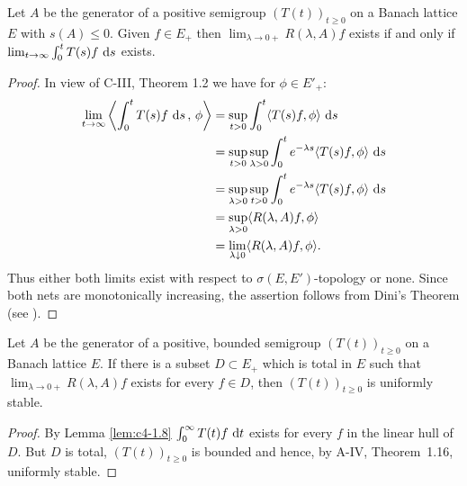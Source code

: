 \begin{lemma}\label{lem:c4-1.8}
%
%
%
Let $A$ be the generator of a positive semigroup $(T(t))_{t\geq 0}$ on a Banach lattice $E$ with $s(A) \leq 0$.
Given $f \in E_{+}$ then $\lim_{\lambda \to 0+} R(\lambda,A)f$ exists if and only if $\lim_{t \to \infty} \int_{0}^{t} T(s)f \, \mathop{}\!\mathrm{d}{s}$ exists.
\end{lemma}
\begin{proof}
In view of C-III, Theorem 1.2 we have for $\phi \in E'_{+}$:
\begin{align*}
\lim_{t \to \infty}  \left\langle\int_{0}^{t} T(s)f \, \mathop{}\!\mathrm{d}{s} \,,\,\phi\right\rangle &= \sup_{t>0} \int_{0}^{t}\langle T(s)f,\phi\rangle \, \mathop{}\!\mathrm{d}{s} \\
&= \sup_{t>0}\sup_{\lambda>0} \int_{0}^{t}e^{-\lambda s}\langle T(s)f,\phi\rangle \, \mathop{}\!\mathrm{d}{s} \\
&= \sup_{\lambda>0}\sup_{t>0} \int_{0}^{t}e^{-\lambda s}\langle T(s)f,\phi\rangle \, \mathop{}\!\mathrm{d}{s} \\
&= \sup_{\lambda>0} \langle R(\lambda,A)f,\phi\rangle \\
&= \lim_{\lambda \downarrow 0} \langle R(\lambda,A)f,\phi\rangle.
\end{align*}
Thus either both limits exist with respect to $\sigma(E,E')$-topology or none.
Since both nets are monotonically increasing, the assertion follows from Dini's Theorem (see \citet[II. Theorem~5.9]{schaefer:1974}).
\end{proof}

\begin{proposition}\label{prop:c4-1.9}
%
%
%
Let $A$ be the generator of a positive, bounded semigroup $(T(t))_{t \geq 0}$ on a Banach lattice $E$.
If there is a subset $D \subset E_{+}$ which is total in $E$ such that $\lim_{\lambda \to 0+} R(\lambda,A)f$ exists for every $f \in D$, then $(T(t))_{t \geq 0}$ is uniformly stable.
\end{proposition}
\begin{proof}
By Lemma \ref{lem:c4-1.8} $\int_{0}^{\infty} T(t)f \, \mathop{}\!\mathrm{d}{t}$ exists for every $f$ in the linear hull of $D$.
But $D$ is total, $(T(t))_{t \geq 0}$ is bounded and hence, by A-IV, Theorem~1.16, uniformly stable.
\end{proof}

